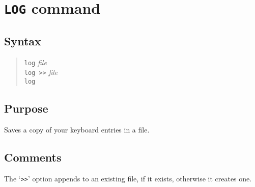 %
%
%
%
\section{{\tt LOG} command}
\subsection{Syntax}
\begin{verse}
{\tt log} {\it file}\\
{\tt log >>} {\it file}\\
{\tt log}
\end{verse}
\subsection{Purpose}

Saves a copy of your keyboard entries in a file.
\subsection{Comments}

The `{\tt >>}' option appends to an existing file, if it exists, otherwise it
creates one.

